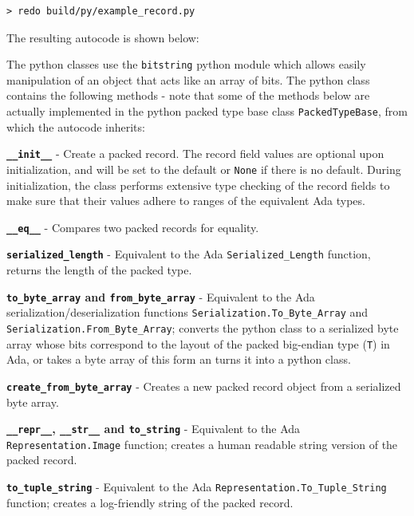\vspace{5mm} %
\begin{verbatim}
> redo build/py/example_record.py
\end{verbatim}
\vspace{5mm} %

The resulting autocode is shown below:


The python classes use the \texttt{bitstring} python module which allows easily manipulation of an object that acts like an array of bits. The python class contains the following methods - note that some of the methods below are actually implemented in the python packed type base class \texttt{PackedTypeBase}, from which the autocode inherits:

\vspace{5mm} %
\begin{spaceditemize}
  \item \textbf{\texttt{\_\_init\_\_}} - Create a packed record. The record field values are optional upon initialization, and will be set to the default or \texttt{None} if there is no default. During initialization, the class performs extensive type checking of the record fields to make sure that their values adhere to ranges of the equivalent Ada types.
  \item \textbf{\texttt{\_\_eq\_\_}} - Compares two packed records for equality.
  \item \textbf{\texttt{serialized\_length}} - Equivalent to the Ada \texttt{Serialized\_Length} function, returns the length of the packed type.
  \item \textbf{\texttt{to\_byte\_array} and \texttt{from\_byte\_array}} - Equivalent to the Ada serialization/deserialization functions \texttt{Serialization.To\_Byte\_Array} and \texttt{Serialization.From\_Byte\_Array}; converts the python class to a serialized byte array whose bits correspond to the layout of the packed big-endian type (\texttt{T}) in Ada, or takes a byte array of this form an turns it into a python class.
  \item \textbf{\texttt{create\_from\_byte\_array}} - Creates a new packed record object from a serialized byte array.
  \item \textbf{\texttt{\_\_repr\_\_}, \texttt{\_\_str\_\_} and \texttt{to\_string}} - Equivalent to the Ada \texttt{Representation.Image} function; creates a human readable string version of the packed record.
  \item \textbf{\texttt{to\_tuple\_string}} - Equivalent to the Ada \texttt{Representation.To\_Tuple\_String} function; creates a log-friendly string of the packed record.
\end{spaceditemize}
\vspace{5mm} %

